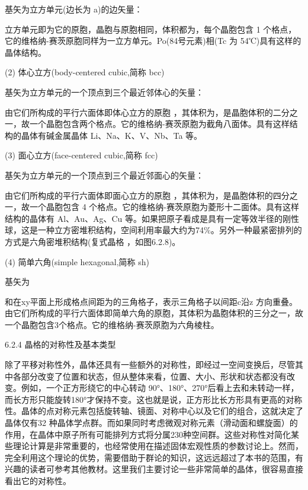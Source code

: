 基矢为立方单元(边长为 a)的边矢量：



立方单元即为它的原胞，晶胞与原胞相同，体积都为，每个晶胞包含 1 个格点，它的维格纳-赛茨原胞同样为一立方单元。Po(84号元素)相(Tc 为 54℃)具有这样的晶体结构。

(2) 体心立方(body-centered cubic,简称 bcc)

基矢为立方单元的一个顶点到三个最近邻体心的矢量：



由它们所构成的平行六面体即体心立方的原胞 ，其体积为，是晶胞体积的二分之一，故一个晶胞包含两个格点。它的维格纳-赛茨原胞为截角八面体。具有这样结构的晶体有碱金属晶体 Li、Na、K、V、Nb、Ta 等。

(3) 面心立方(face-centered cubic,简称 fcc)

基矢为立方单元的一个顶点到三个最近邻面心的矢量：



由它们所构成的平行六面体即面心立方的原胞 ，其体积为，是晶胞体积的四分之一，故一个晶胞包含 4 个格点。它的维格纳-赛茨原胞为菱形十二面体。具有这样结构的晶体有 Al、Au、Ag、Cu 等。如果把原子看成是具有一定等效半径的刚性球，这是一种立方密堆积结构，空间利用率最大约为74\%。另外一种最紧密排列的方式是六角密堆积结构(复式晶格 ，如图6.2.8)。

(4) 简单六角(simple hexagonal,简称 sh)

基矢为



和在xy平面上形成格点间距为的三角格子，表示三角格子以间距c沿z 方向重叠。由它们所构成的平行六面体即简单六角的原胞，其体积为晶胞体积的三分之一，故一个晶胞包含3个格点。它的维格纳-赛茨原胞为六角棱柱。



6.2.4 晶格的对称性及基本类型

除了平移对称性外，晶体还具有一些额外的对称性，即经过一空间变换后，尽管其中各部分改变了位置和状态，但从整体来看，位置、大小、形状和状态都没有改变。例如，一个正方形绕它的中心转动 90°、180°、270°后看上去和未转动一样，而长方形只能旋转180°才保持不变。这也就是说，正方形比长方形具有更高的对称性。晶体的点对称元素包括旋转轴、镜面、对称中心以及它们的组合，这就决定了晶体仅有32 种晶体学点群。而如果同时考虑微观对称元素（滑动面和螺旋面）的作用，在晶体中原子所有可能排列方式将分属230种空间群。这些对称性对简化某些理论计算是非常重要的，也经常使用在描述固体宏观性质的参数讨论上。然而，完全利用这个理论的优势，需要借助于群论的知识，这远远超过了本书的范围，有兴趣的读者可参考其他教材。这里我们主要讨论一些非常简单的晶体，很容易直接看出它的对称性。

